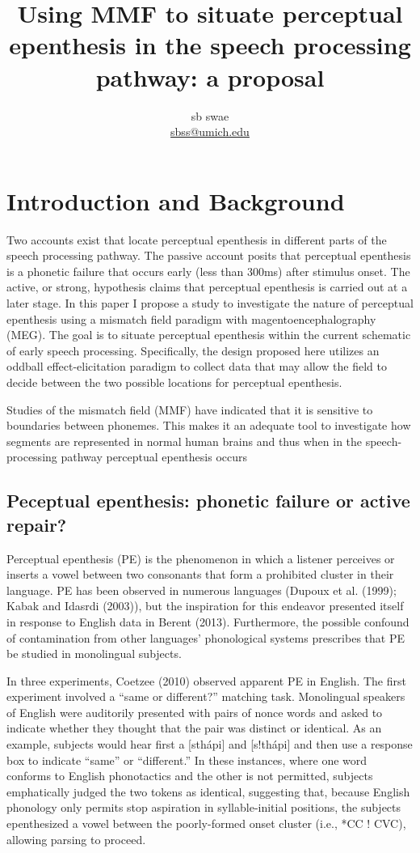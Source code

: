 \documentclass[jou,apacite]{apa6}
\title{Using MMF to situate perceptual epenthesis in the speech processing pathway: a proposal}
\author{sb swae\\\href{mailto:sbss@umich.edu}{sbss@umich.edu}}
\begin{document}
\maketitle    
                        
\section{Introduction and Background}
    Two accounts exist that locate perceptual epenthesis in different parts of the speech processing pathway. The passive account posits that perceptual epenthesis is a phonetic failure that occurs early (less than 300ms) after stimulus onset. The active, or strong, hypothesis claims that perceptual epenthesis is carried out at a later stage. In this paper I propose a study to investigate the nature of perceptual epenthesis using a mismatch field paradigm with magentoencephalography (MEG). The goal is to situate perceptual epenthesis within the current schematic of early speech processing. Specifically, the design proposed here utilizes an oddball effect-elicitation paradigm to collect data that may allow the field to decide between the two possible locations for perceptual epenthesis.
    
    Studies of the mismatch field (MMF) have indicated that it is sensitive to boundaries between phonemes. This makes it an adequate tool to investigate how segments are represented in normal human brains and thus when in the speech-processing pathway perceptual epenthesis occurs

    \subsection{Peceptual epenthesis: phonetic failure or active repair?}
    Perceptual epenthesis (PE) is the phenomenon in which a listener perceives or inserts a vowel between two consonants that form a prohibited cluster in their language. PE has been observed in numerous languages (Dupoux et al. (1999); Kabak and Idasrdi (2003)), but the inspiration for this endeavor presented itself in response to English data in Berent (2013). Furthermore, the possible confound of contamination from other languages’ phonological systems prescribes that PE be studied in monolingual subjects.

    In three experiments, Coetzee (2010) observed apparent PE in English. The first experiment involved a “same or different?” matching task. Monolingual speakers of English were auditorily presented with pairs of nonce words and asked to indicate whether they thought that the pair was distinct or identical. As an example, subjects would hear first a [sthápi] and [s!thápi] and then use a response box to indicate “same” or “different.” In these instances, where one word conforms to English phonotactics and the other is not permitted, subjects emphatically judged the two tokens as identical, suggesting that, because English phonology only permits stop aspiration in syllable-initial positions, the subjects epenthesized a vowel between the poorly-formed onset cluster (i.e., *CC ! CVC), allowing parsing to proceed.
    
\end{document}
